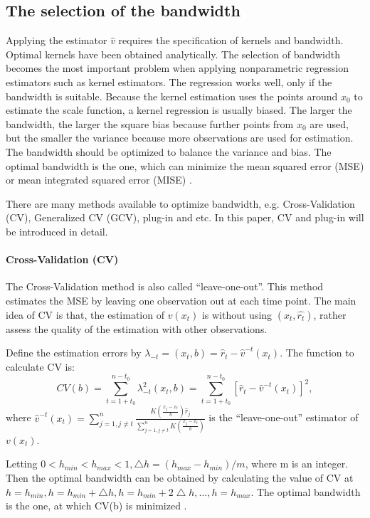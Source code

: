 \subsection{The selection of the bandwidth}
Applying the estimator $\hat{v}$ requires the specification of kernels and bandwidth. Optimal kernels have been obtained analytically. The selection of bandwidth becomes the most important problem when applying nonparametric regression estimators such as kernel estimators. The regression works well, only if the bandwidth is suitable. Because the kernel estimation uses the points around $x_{0}$ to estimate the scale function, a kernel regression is usually biased. The larger the bandwidth, the larger the square bias because further points from $x_{0}$ are used, but the smaller the variance because more observations are used for estimation. The bandwidth should be optimized to balance the variance and bias. The optimal bandwidth is the one, which can minimize the mean squared error (MSE) or mean integrated squared error (MISE) \citep{Gasser1991}. 

There are many methods available to optimize bandwidth, e.g. Cross-Validation (CV), Generalized CV (GCV), plug-in and etc. In this paper, CV and plug-in will be introduced in detail.

\paragraph{Cross-Validation (CV)}

The Cross-Validation method is also called “leave-one-out”. This method estimates the MSE by leaving one observation out at each time point. The main idea of CV is that, the estimation of $v(x_{t})$ is without using $(x_{t},\hat{r_{t}})$, rather assess the quality of the estimation with other observations. 

Define the estimation errors by $\lambda_{-t}=(x_{t},b)=\hat{r}_{t}-\hat{v}^{-t}(x_{t})$. The function to calculate CV is:
\begin{equation}
CV(b) = \sum_{t=1+t_{0}}^{n-t_{0}}\lambda_{-t}^{2}(x_{t},b)=\sum_{t=1+t_{0}}^{n-t_{0}}[\hat{r}_{t}-\hat{v}^{-t}(x_{t})]^{2},
\end{equation}
where $\hat{v}^{-t}(x_t)=\sum_{j=1,j\neq t}^{n}\frac{K(\frac{x_{j}-x_{t}}{b})\hat{r}_{j}}{\sum_{j=1,j \neq t}^{n}K(\frac{x_{j}-x_{t}}{b})}$ is the ``leave-one-out'' estimator of $v(x_{t})$.

Letting $0<h_{min}<h_{max}<1, \bigtriangleup h=(h_{max}-h_{min})/m$, where m is an integer. Then the optimal bandwidth can be obtained by calculating the value of CV at $h=h_{min}, h=h_{min} + \bigtriangleup h, h=h_{min} + 2\bigtriangleup h, \ldots, h=h_{max}$. The optimal bandwidth is the one, at which CV(b) is minimized \citep{Sarda1993}.

